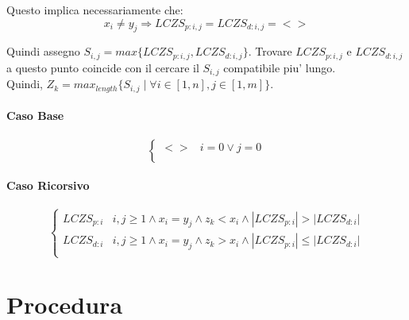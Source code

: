Questo implica necessariamente che:
\[
    x_i \ne y_j \Rightarrow LCZS_{p:i,j} = LCZS_{d:i,j} = <>
\]

Quindi assegno $S_{i,j} = max \{ LCZS_{p:i,j}, LCZS_{d:i,j} \}$.
Trovare $LCZS_{p:i,j}$ e $LCZS_{d:i,j}$ a questo punto coincide con il cercare il $S_{i,j}$ compatibile piu' lungo. \\
Quindi, $Z_k = max_{length} \{ S_{i,j} \mid \forall i \in [1,n], j \in [1,m] \}$.

\paragraph{Caso Base}

\[
    \begin{cases}
        \text{$<>$} & \text{$i = 0 \lor j = 0$} \\
    \end{cases}
\]

\paragraph{Caso Ricorsivo}

\[
    \begin{cases}
        \text{$LCZS_{p:i}$} & \text{$i,j \geq 1 \land x_i = y_j \land z_{k} < x_i \land |LCZS_{p:i}| > |LCZS_{d:i}|$} \\
        \text{$LCZS_{d:i}$} & \text{$i,j \geq 1 \land x_i = y_j \land z_{k} > x_i \land |LCZS_{p:i}| \leq |LCZS_{d:i}|$} \\
    \end{cases}
\]

\newpage

\section{Procedura}

